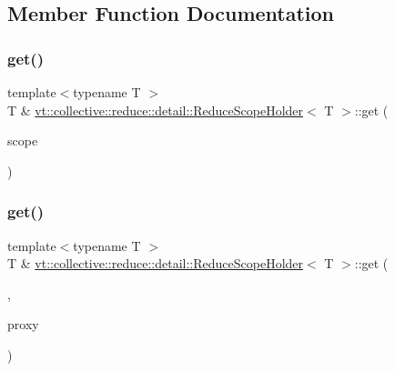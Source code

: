 \subsection{Member Function Documentation}
\mbox{\label{structvt_1_1collective_1_1reduce_1_1detail_1_1_reduce_scope_holder_a2cdb8cd71e43cc7a744bdd16d5ed1651}} 
\subsubsection{\texorpdfstring{get()}{get()}\hspace{0.1cm}{\footnotesize\ttfamily [1/6]}}
{\footnotesize\ttfamily template$<$typename T $>$ \\
T \& \hyperlink{structvt_1_1collective_1_1reduce_1_1detail_1_1_reduce_scope_holder}{vt\+::collective\+::reduce\+::detail\+::\+Reduce\+Scope\+Holder}$<$ T $>$\+::get (\begin{DoxyParamCaption}\item[{\hyperlink{structvt_1_1collective_1_1reduce_1_1detail_1_1_reduce_scope}{Reduce\+Scope} const \&}]{scope }\end{DoxyParamCaption})}

\mbox{\label{structvt_1_1collective_1_1reduce_1_1detail_1_1_reduce_scope_holder_accca4de877182ade06a16d3954590e51}} 
\subsubsection{\texorpdfstring{get()}{get()}\hspace{0.1cm}{\footnotesize\ttfamily [2/6]}}
{\footnotesize\ttfamily template$<$typename T $>$ \\
T \& \hyperlink{structvt_1_1collective_1_1reduce_1_1detail_1_1_reduce_scope_holder}{vt\+::collective\+::reduce\+::detail\+::\+Reduce\+Scope\+Holder}$<$ T $>$\+::get (\begin{DoxyParamCaption}\item[{\hyperlink{structvt_1_1collective_1_1reduce_1_1detail_1_1_reduce_scope_holder_1_1_obj_group_tag}{Obj\+Group\+Tag}}]{,  }\item[{\hyperlink{namespacevt_ad7cae989df485fccca57f0792a880a8e}{Obj\+Group\+Proxy\+Type}}]{proxy }\end{DoxyParamCaption})}

